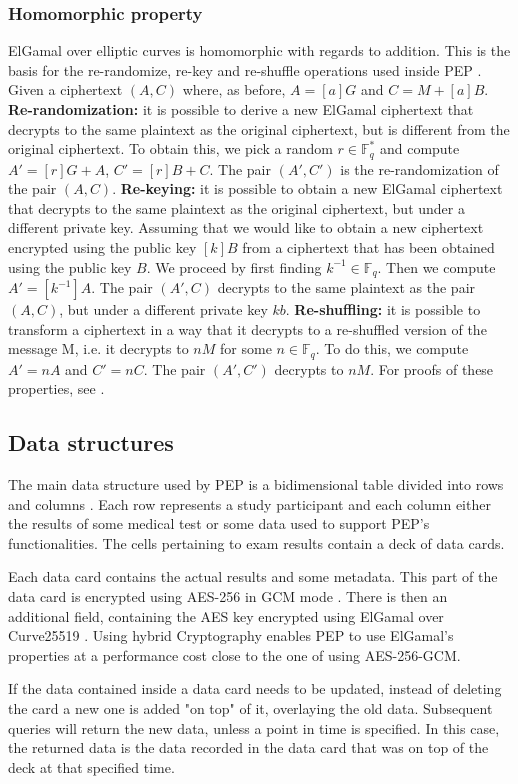 \documentclass{report}
\begin{document}
\subsubsection{Homomorphic property}
ElGamal over elliptic curves is homomorphic with regards to addition. This is the basis for the re-randomize, re-key and re-shuffle operations used inside PEP \cite{peppaper}.
\newline \newline
Given a ciphertext $(A, C)$ where, as before, $A=[a]G$ and $C=M+[a]B$.
\textbf{Re-randomization:} it is possible to derive a new ElGamal ciphertext that decrypts to the same plaintext as the original ciphertext, but is different from the original
ciphertext. To obtain this, we pick a random $r \in \mathds{F}^*_q$ and compute $A'=[r]G+A$, $C'=[r]B+C$. The pair $(A', C')$ is the re-randomization of the pair $(A, C)$. \newline
\textbf{Re-keying:} it is possible to obtain a new ElGamal ciphertext that decrypts to the same plaintext as the original ciphertext, but under a different private key. Assuming
that we would like to obtain a new ciphertext encrypted using the public key $[k]B$ from a ciphertext that has been obtained using the public key $B$. We proceed by first
finding $k^{-1} \in \mathds{F}_q$. Then we compute $A'=[k^{-1}]A$. The pair $(A', C)$ decrypts to the same plaintext as the pair $(A, C)$, but under a different private key $kb$.
\newline
\textbf{Re-shuffling:} it is possible to transform a ciphertext in a way that it decrypts to a re-shuffled version of the message M, i.e. it decrypts to $nM$ for some $n \in
\mathds{F}_q$. To do this, we compute $A'=nA$ and $C'=nC$. The pair $(A', C')$ decrypts to $nM$. \newline
For proofs of these properties, see \cite{pep-whitepaper}. 

\subsection{Data structures}
The main data structure used by PEP is a bidimensional table divided into rows and columns \cite{pep-blueprint}. Each row represents a study participant and each column either the 
results of some medical test or some data used to support PEP's functionalities. The cells pertaining to exam results contain a deck of data cards. \par
Each data card contains the actual results and some metadata. This part of the data card is encrypted using AES-256 \cite{AES-standard} in GCM mode \cite{GCM}. There is then an 
additional field, containing the AES key encrypted using ElGamal over Curve25519 \cite{elliptic-elgamal}. Using hybrid Cryptography enables PEP to use ElGamal's properties at a 
performance cost close to the one of using AES-256-GCM. \par
If the data contained inside a data card needs to be updated, instead of deleting the card a new one is added "on top" of it, overlaying the old data. Subsequent queries will
return the new data, unless a point in time is specified. In this case, the returned data is the data recorded in the data card that was on top of the deck at that specified
time.
\end{document}
